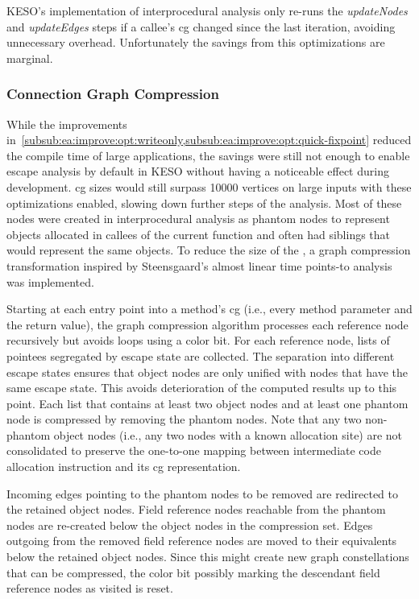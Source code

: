 				KESO's implementation of interprocedural analysis only re-runs the \emph{updateNodes} and \emph{updateEdges}
				steps if a callee's \gls{cg} changed since the last iteration, avoiding unnecessary overhead. Unfortunately the
				savings from this optimizations are marginal.

			\subsubsection{Connection Graph Compression}
				\label{subsub:ea:improve:opt:compression}
				While the improvements in~\cref{subsub:ea:improve:opt:writeonly,subsub:ea:improve:opt:quick-fixpoint} reduced
				the compile time of large applications, the savings were still not enough to enable escape analysis by default
				in KESO without having a noticeable effect during development. \Acrlong{cg} sizes would still surpass 10000
				vertices on large inputs with these optimizations enabled, slowing down further steps of the analysis. Most of
				these nodes were created in interprocedural analysis as phantom nodes to represent objects allocated in callees
				of the current function and often had siblings that would represent the same objects. To reduce the size of the
				, a graph compression transformation inspired by Steensgaard's almost linear time points-to
				analysis~\cite{steensgaard:96:popl} was implemented.

				Starting at each entry point into a method's \gls{cg} (i.e., every method parameter and the return value), the
				graph compression algorithm processes each reference node recursively but avoids loops using a color bit. For
				each reference node, lists of pointees segregated by escape state are collected. The separation into different
				escape states ensures that object nodes are only unified with nodes that have the same escape state. This avoids
				deterioration of the computed results up to this point. Each list that contains at least two object nodes and at
				least one phantom node is compressed by removing the phantom nodes. Note that any two non-phantom object nodes
				(i.e., any two nodes with a known allocation site) are not consolidated to preserve the one-to-one mapping
				between intermediate code allocation instruction and its \gls{cg} representation.

				Incoming edges pointing to the phantom nodes to be removed are redirected to the retained object nodes. Field
				reference nodes reachable from the phantom nodes are re-created below the object nodes in the compression set.
				Edges outgoing from the removed field reference nodes are moved to their equivalents below the retained object
				nodes. Since this might create new graph constellations that can be compressed, the color bit possibly marking
				the descendant field reference nodes as visited is reset.

